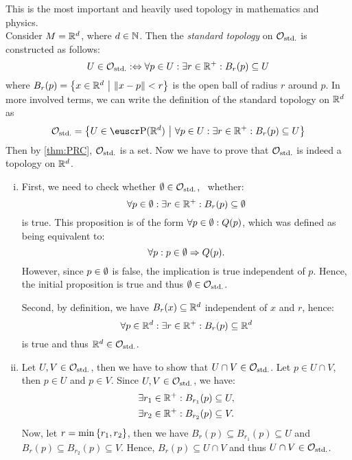\begin{example}
	This is the most important and heavily used topology in mathematics and physics.\\
	Consider \(M = \mathbb R^d\), where \(d \in \mathbb N\). Then the \emph{standard topology} on \(\mathcal{O}_{\text{std.}}\) is constructed as follows:
	\begin{equation*}
		U \in \mathcal{O}_{\text{std.}} :\Leftrightarrow \forall p \in U: \exists r \in \mathbb R^+: B_r(p) \subseteq U \label{eq:standard_topology}
	\end{equation*}
	where \(B_r(p) = \qty{x \in \mathbb R^d \ \middle|\ \norm{x - p} < r}\) is the open ball of radius \(r\) around \(p\). In more involved terms, we can write the definition of the standard topology on \(\mathbb R^d\) as
	\begin{equation*}
		\Ostd = \qty{U \in \powerset(\R^d) \mid \forall p \in U: \exists r \in \R^+: B_r(p) \subseteq U} \label{eq:standard_topology_explicit}
	\end{equation*}
	Then by \cref{thm:PRC}, \(\mathcal{O}_{\text{std.}}\) is a set. Now we have to prove that \(\mathcal{O}_{\text{std.}}\) is indeed a topology on \(\mathbb R^d\).
	\begin{enumerate}[(i)]
		\item First, we need to check whether \(\emptyset \in \mathcal{O}_{\text{std.}}\), \ie\ whether:
		      \begin{equation*}
			      \forall p \in \emptyset : \exists r \in \mathbb R^+ : B_r(p) \subseteq \emptyset
		      \end{equation*}
		      is true. This proposition is of the form \(\forall p \in \emptyset : Q(p)\), which was defined as being equivalent to:
		      \begin{equation*}
			      \forall p : p \in \emptyset \Rightarrow Q(p).
		      \end{equation*}
		      However, since \(p \in \emptyset\) is false, the implication is true independent of \(p\). Hence, the initial proposition is true and thus \(\emptyset \in \mathcal{O}_{\text{std.}}\).

		      Second, by definition, we have \(B_r(x) \subseteq \mathbb R^d\) independent of \(x\) and \(r\), hence:
		      \begin{equation*}
			      \forall p \in \mathbb R^d : \exists r \in \mathbb R^+ : B_r(p) \subseteq \mathbb R^d
		      \end{equation*}
		      is true and thus \(\mathbb R^d\in\mathcal{O}_{\text{std.}}\).

		\item Let \(U, V \in \mathcal{O}_{\text{std.}}\), then we have to show that \(U\cap V\in\mathcal{O}_{\text{std.}}\). Let \(p \in U\cap V\), then \(p \in U\) and \(p \in V\). Since \(U, V \in \mathcal{O}_{\text{std.}}\), we have:
		      \begin{align*}
			      \exists r_1 \in \mathbb R^+ : B_{r_1}(p) & \subseteq U, \\
			      \exists r_2 \in \mathbb R^+ : B_{r_2}(p) & \subseteq V.
		      \end{align*}
		      Now, let \(r = \min\qty{r_1, r_2}\), then we have \(B_r(p) \subseteq B_{r_1}(p) \subseteq U\) and \(B_r(p) \subseteq B_{r_2}(p) \subseteq V\). Hence, \(B_r(p) \subseteq U\cap V\) and thus \(U\cap V\in\mathcal{O}_{\text{std.}}\).


\end{enumerate}
\end{example}
